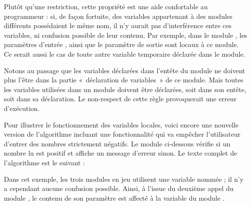 	Plutôt qu’une restriction, cette propriété est
	une aide confortable au programmeur : si, de
	façon fortuite, des variables appartenant à des modules différents
	possédaient le même nom, il n’y aurait pas d’interférence entre ces
	variables, ni confusion possible de leur
	contenu. Par exemple, dans le module
	, les paramètres d’entrée 
	, 
	ainsi que le paramètre de sortie 
	sont locaux à ce module. 
	Ce serait aussi le cas de toute autre variable temporaire 
	déclarée dans le module.

	Notons au passage que les variables déclarées dans l’entête du module ne
	doivent plus l’être dans la partie «~déclaration de variables~» de ce
	module. Mais toutes les variables utilisées dans un module doivent être
	déclarées, soit dans son entête, soit dans sa déclaration. Le
	non-respect de cette règle provoquerait une erreur d’exécution.

	Pour illustrer le fonctionnement des variables
	locales, voici encore une nouvelle version de l’algorithme incluant une
	fonctionnalité qui va empêcher l’utilisateur d’entrer des nombres
	strictement négatifs. Le module
	 ci-dessous
	vérifie si un nombre lu est positif et affiche un message
	d'erreur sinon. Le texte complet de l’algorithme est
	le suivant :




	Dans cet exemple, les trois modules en jeu utilisent 
	une variable nommée ; 
	il n’y a cependant aucune confusion possible. 
	Ainsi, à l’issue du deuxième appel du module
	, 
	le contenu de son paramètre 
	est affecté à la variable 
	du module .

